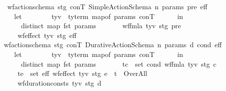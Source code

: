 \begin{isabellebody}
\ \ \ \ {\isachardoublequoteopen}wf{\isacharunderscore}{\kern0pt}action{\isacharunderscore}{\kern0pt}schema{\isacharprime}{\kern0pt}\ stg\ conT\ {\isacharparenleft}{\kern0pt}Simple{\isacharunderscore}{\kern0pt}Action{\isacharunderscore}{\kern0pt}Schema\ n\ params\ pre\ eff{\isacharparenright}{\kern0pt}\ {\isasymlongleftrightarrow}\ {\isacharparenleft}{\kern0pt}\isanewline
\ \ \ \ \ \ let\isanewline
\ \ \ \ \ \ \ \ tyv\ {\isacharequal}{\kern0pt}\ ty{\isacharunderscore}{\kern0pt}term{\isacharprime}{\kern0pt}\ {\isacharparenleft}{\kern0pt}map{\isacharunderscore}{\kern0pt}of\ params{\isacharparenright}{\kern0pt}\ conT\isanewline
\ \ \ \ \ \ in\isanewline
\ \ \ \ \ \ \ \ distinct\ {\isacharparenleft}{\kern0pt}map\ fst\ params{\isacharparenright}{\kern0pt}\isanewline
\ \ \ \ \ \ {\isasymand}\ wf{\isacharunderscore}{\kern0pt}fmla{\isacharprime}{\kern0pt}\ tyv\ stg\ pre\isanewline
\ \ \ \ \ \ {\isasymand}\ wf{\isacharunderscore}{\kern0pt}effect{\isacharprime}{\kern0pt}\ tyv\ stg\ eff{\isacharparenright}{\kern0pt}{\isachardoublequoteclose}\isanewline
\ \ {\isacharbar}{\kern0pt}\ {\isachardoublequoteopen}wf{\isacharunderscore}{\kern0pt}action{\isacharunderscore}{\kern0pt}schema{\isacharprime}{\kern0pt}\ stg\ conT\ {\isacharparenleft}{\kern0pt}Durative{\isacharunderscore}{\kern0pt}Action{\isacharunderscore}{\kern0pt}Schema\ n\ params\ d\ cond\ eff{\isacharparenright}{\kern0pt}\ {\isasymlongleftrightarrow}\ {\isacharparenleft}{\kern0pt}\isanewline
\ \ \ \ \ \ let\isanewline
\ \ \ \ \ \ \ \ tyv\ {\isacharequal}{\kern0pt}\ ty{\isacharunderscore}{\kern0pt}term{\isacharprime}{\kern0pt}\ {\isacharparenleft}{\kern0pt}map{\isacharunderscore}{\kern0pt}of\ params{\isacharparenright}{\kern0pt}\ conT\isanewline
\ \ \ \ \ \ in\isanewline
\ \ \ \ \ \ \ \ distinct\ {\isacharparenleft}{\kern0pt}map\ fst\ params{\isacharparenright}{\kern0pt}\isanewline
\ \ \ \ \ \ {\isasymand}\ {\isacharparenleft}{\kern0pt}{\isasymforall}{\isacharparenleft}{\kern0pt}t{\isacharcomma}{\kern0pt}c{\isacharparenright}{\kern0pt}\ {\isasymin}\ set\ cond{\isachardot}{\kern0pt}\ wf{\isacharunderscore}{\kern0pt}fmla{\isacharprime}{\kern0pt}\ tyv\ stg\ c{\isacharparenright}{\kern0pt}\isanewline
\ \ \ \ \ \ {\isasymand}\ {\isacharparenleft}{\kern0pt}{\isasymforall}{\isacharparenleft}{\kern0pt}t{\isacharcomma}{\kern0pt}e{\isacharparenright}{\kern0pt}\ {\isasymin}\ set\ eff{\isachardot}{\kern0pt}\ wf{\isacharunderscore}{\kern0pt}effect{\isacharprime}{\kern0pt}\ tyv\ stg\ e\ {\isasymand}\ t\ {\isasymnoteq}\ Over{\isacharunderscore}{\kern0pt}All{\isacharparenright}{\kern0pt}\isanewline
\ \ \ \ \ \ {\isasymand}\ wf{\isacharunderscore}{\kern0pt}duration{\isacharunderscore}{\kern0pt}consts{\isacharprime}{\kern0pt}\ tyv\ stg\ d{\isacharparenright}{\kern0pt}{\isachardoublequoteclose}\isanewline

\end{isabellebody}
